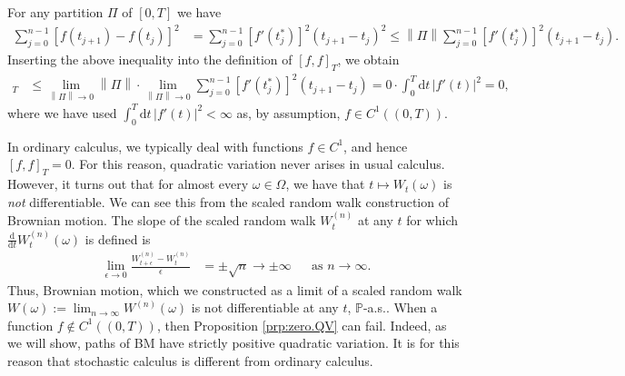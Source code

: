 \documentclass[12pt]{book}
\let\varepsilon\epsilon
\numberwithin{equation}{chapter}
\theoremstyle{plain}
\numberwithin{theorem}{section}
\theoremstyle{definition}
\numberwithin{exercise}{chapter}
\let\oldendproof\endproof
\renewenvironment{proof}[1][\proofname]{%
  \oldproof[\scshape\underline{#1}]%
}{\oldendproof}
\newcommand{\<}{\langle}
\renewcommand{\>}{\rangle}
\renewcommand{\(}{\left(}
\renewcommand{\)}{\right)}
\renewcommand{\[}{\left[}
\renewcommand{\]}{\right]}
\newcommand\Pb{\mathds{P}}
\newcommand\eps{\varepsilon}
\newcommand\om{\omega}
\newcommand\Om{\Omega}
\newcommand\dd{\mathrm{d}}
\newcommand{\norm}[1]{\left\|#1\right\|}
\begin{document}
\begin{proof}
For any partition $\Pi$ of $[0,T]$ we have
\begin{align}
\sum_{j=0}^{n-1} \[ f(t_{j+1}) - f(t_j) \]^2
	&=	\sum_{j=0}^{n-1} [ f'(t_j^*) ]^2 ( t_{j+1} - t_j )^2
	\leq \norm{\Pi} \sum_{j=0}^{n-1} [ f'(t_j^*) ]^2 ( t_{j+1} - t_j ) .
\end{align}
Inserting the above inequality into the definition of $[f,f]_T$, we obtain
\begin{align}
[f,f]_T
	&\leq \lim_{\norm{\Pi} \to 0} \norm{\Pi} \cdot \lim_{\norm{\Pi}\to 0} \sum_{j=0}^{n-1} [ f'(t_j^*) ]^2 ( t_{j+1} - t_j ) 
	=	0 \cdot \int_0^T \dd t \, |f'(t)|^2 = 0 ,
\end{align}
where we have used $\int_0^T \dd t \, |f'(t)|^2 < \infty$ as, by assumption, $f \in C^1((0,T))$.
\end{proof}

\noindent
In ordinary calculus, we typically deal with functions $f \in C^1$, and hence $[f,f]_T = 0$.  For this reason, quadratic variation never arises in usual calculus.  However, it turns out that for almost every $\om \in \Om$, we have that $t \mapsto W_t(\om)$ is \emph{not} differentiable. We can see this from the scaled random walk construction of Brownian motion.  The slope of the scaled random walk $W_t^{(n)}$ at any $t$ for which $\frac{\dd}{\dd t} W_t^{(n)}(\om)$ is defined is
\begin{align}
\lim_{\eps \to 0} \frac{ W_{t+\eps}^{(n)} - W_{t}^{(n)} }{\eps}
	&=	\pm \sqrt{n} \to \pm \infty &
	&\text{as $n \to \infty$}.
\end{align}
Thus, Brownian motion, which we constructed as a limit of a scaled random walk $W(\om) := \lim_{n \to \infty} W^{(n)}(\om)$ is not differentiable at any $t$, $\Pb$-a.s..
When a function $f \notin C^1((0,T))$, then Proposition \ref{prp:zero.QV} can fail.  
Indeed, as we will show, paths of BM have strictly positive quadratic variation.  
It is for this reason that stochastic calculus is different from ordinary calculus.
\end{document}
